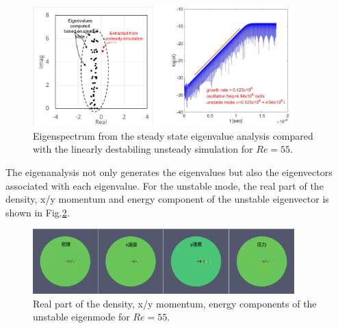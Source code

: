\documentclass[journal,final]{new-aiaa}
\begin{document}
\begin{figure}[htb]
	\centering   
	\includegraphics[width=0.9\textwidth]{pic/uns-vs-eigen.png}	
	\caption{Eigenspectrum from the steady state eigenvalue analysis
		compared with the linearly destabiling unsteady simulation for $Re=55$.}
	\label{fig:cyl-re55-eigen-vs-uns}
\end{figure}

The eigenanalysis not only generates the eigenvalues but also the eigenvectors
associated with each eigenvalue. For the unstable mode, the real part of the
density, x/y momentum and energy component of the unstable eigenvector
is shown in Fig.\ref{fig:cyl-re55-eigenmode}.
\begin{figure}[htb]
	\centering   
	\includegraphics[width=0.9\textwidth]{pic/eigenmode-real.png}	
	\caption{Real part of the density, x/y momentum, energy components
		of the unstable eigenmode for $Re=55$.}
	\label{fig:cyl-re55-eigenmode}
\end{figure}
\end{document}
